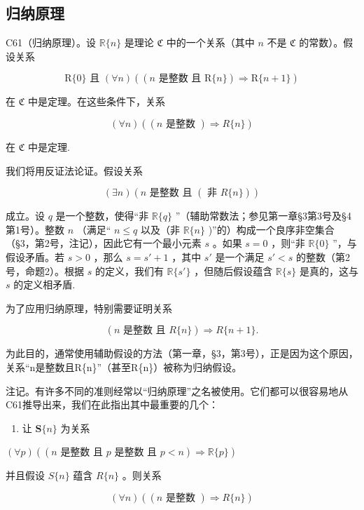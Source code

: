 \subsection{归纳原理}

C61（归纳原理）。设 \(\mathbb{R}\{n\}\) 是理论 \(\mathfrak{C}\) 中的一个关系（其中 \(n\) 不是 \(\mathfrak{C}\) 的常数）。假设关系

\[
\mathrm{R} \{0 \} \text { 且 } (\forall n) ((n \text { 是整数   且 } \mathrm{R} \{n \}) \Longrightarrow \mathrm{R} \{n + 1 \})
\]

在 \(\mathfrak{C}\) 中是定理。在这些条件下，关系

\[
(\forall n) ((n \text {   是整数   }) \Longrightarrow R \{n \})
\]

在 \(\mathfrak{C}\) 中是定理.

我们将用反证法论证。假设关系

\[
(\exists n) (n \text {   是整数   且   } (\text { 非   } R \{n \}))
\]

成立。设 \(q\) 是一个整数，使得“非 \(\mathbb{R}\{q\}\) ”（辅助常数法；参见第一章§3第3号及§4第1号）。整数 \(n\) （满足“ \(n \leqslant q\) 以及（非 \(\mathbb{R}\{n\}\) )''的）构成一个良序非空集合（§3，第2号，注记），因此它有一个最小元素 \(s\) 。如果 \(s = 0\) ，则“非 \(\mathbb{R}\{0\}\) ''，与假设矛盾。若 \(s > 0\) ，那么 \(s = s' + 1\) ，其中 \(s'\) 是一个满足 \(s' < s\) 的整数（第2号，命题2）。根据 \(s\) 的定义，我们有 \(\mathbb{R}\{s'\}\) ，但随后假设蕴含 \(\mathbb{R}\{s\}\) 是真的，这与 \(s\) 的定义相矛盾.

为了应用归纳原理，特别需要证明关系

\[
(n \text {   是整数   且   } R \{n \}) \Longrightarrow R \{n + 1 \}.
\]

为此目的，通常使用辅助假设的方法（第一章，§3，第3号），正是因为这个原因，关系“n是整数且R\{n\}''（甚至R\{n\}）被称为归纳假设。

注记。有许多不同的准则经常以“归纳原理”之名被使用。它们都可以很容易地从C61推导出来，我们在此指出其中最重要的几个：

\begin{enumerate}
\def\labelenumi{(\arabic{enumi})}
\tightlist
\item
  让 \(\mathbf{S}\{n\}\) 为关系
\end{enumerate}

\((\forall p)((n \text{ 是整数 且 } p \text{ 是整数 且 } p < n) \Longrightarrow \mathbb{R}\{p\})\)

并且假设 \(S\{n\}\) 蕴含 \(R\{n\}\) 。则关系

\[
(\forall n) ((n \text {   是整数   }) \Longrightarrow R \{n \})
\]

